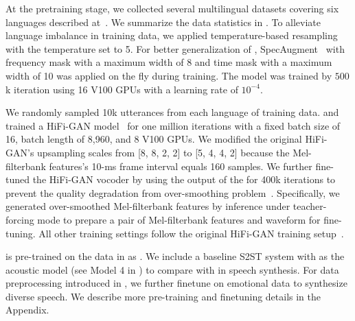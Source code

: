 At the pretraining stage, we collected several multilingual datasets covering six languages described at~. 
We summarize the data statistics in .
To alleviate language imbalance in training data, we applied temperature-based resampling with the temperature set to 5.
For better generalization of \ptvemb, SpecAugment~\citep{park2019specaugment} with frequency mask with a maximum width of 8 and time mask with a maximum width of 10 was applied on the fly during training.
The \ptv model was trained by $500$k iteration using 16 V100 GPUs with a learning rate of $10^{-4}$.


We randomly sampled 10k utterances from each language of \ptv training data.
and trained a HiFi-GAN model~\citep{kong2020hifi} for one million iterations with a fixed batch size of 16, batch length of 8,960, and 8 V100 GPUs.
We modified the original HiFi-GAN's upsampling scales from [8, 8, 2, 2] to [5, 4, 4, 2] because the Mel-filterbank features's 10-ms frame interval equals 160 samples.
We further fine-tuned the HiFi-GAN vocoder by using the output of the \ptv for 400k iterations to prevent the quality degradation from over-smoothing problem~\citep{bishop94mixturedensity}.
Specifically, we generated over-smoothed Mel-filterbank features by inference \ptv under teacher-forcing mode to prepare a pair of Mel-filterbank features and waveform for fine-tuning.
All other training settings follow the original HiFi-GAN training setup~\citep{kong2020hifi}.








\unitvb is pre-trained on the data in  as \ptv. We include a baseline S2ST system with \ptv as the acoustic model (see Model 4 in ) to compare with \ptv in speech synthesis. For data preprocessing introduced in , we further finetune \unitvb on emotional data to synthesize diverse speech. We describe more pre-training and finetuning details in the Appendix.

